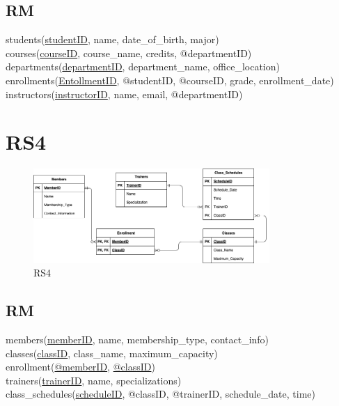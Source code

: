 \documentclass{article}
\begin{document}
\begin{CJK*}{UTF8}{gbsn}
    \subsection{RM}
    students(\underline{studentID}, name, date\_of\_birth, major)
    \\courses(\underline{courseID}, course\_name, credits, @departmentID)
    \\departments(\underline{departmentID}, department\_name, office\_location)
    \\enrollments(\underline{EntollmentID}, @studentID, @courseID, grade, enrollment\_date)
    \\instructors(\underline{instructorID}, name, email, @departmentID)

    \section{RS4}
    \begin{figure}[H]
        \centering
        \includegraphics[width=0.8\textwidth]{RS4.png}
        \caption{RS4}
    \end{figure}
    \subsection{RM}
    members(\underline{memberID}, name, membership\_type, contact\_info)
    \\classes(\underline{classID}, class\_name, maximum\_capacity)
    \\enrollment(\underline{@memberID}, \underline{@classID})
    \\trainers(\underline{trainerID}, name, specializations)
    \\class\_schedules(\underline{scheduleID}, @classID, @trainerID, schedule\_date, time)

\end{CJK*}
\end{document}
